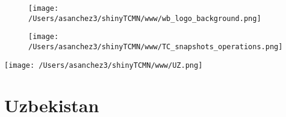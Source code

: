 \documentclass{article}\usepackage[]{graphicx}\usepackage[]{color}
\begin{document}
%

\begin{figure}
  \vspace{-3ex} %
  \hspace{-7ex} %
  \texttt{[image: /Users/asanchez3/shinyTCMN/www/wb\_logo\_background.png]}
\end{figure}
\begin{figure}
  \begin{minipage}[t]{0.99\textwidth} %
      \vspace{-30ex}
      \hspace{-2ex}
      \raggedright{\texttt{[image: /Users/asanchez3/shinyTCMN/www/TC\_snapshots\_operations.png]}}
  \end{minipage}
\end{figure}
%
\begin{minipage}[t]{0.99\textwidth} %
  \vspace{-1.5cm}
  \begin{minipage}[c]{0.36\textwidth} 
    \begin{minipage}[c]{0.28\textwidth} %
      \texttt{[image: /Users/asanchez3/shinyTCMN/www/UZ.png]}
    \end{minipage}
    \begin{minipage}[c]{0.70\textwidth} %
      \section*{\color{blue!40!black}Uzbekistan}
    \end{minipage}
  \end{minipage}
  \begin{minipage}[c]{0.63\textwidth}
  \end{minipage}  
\end{minipage} %
\end{document}

